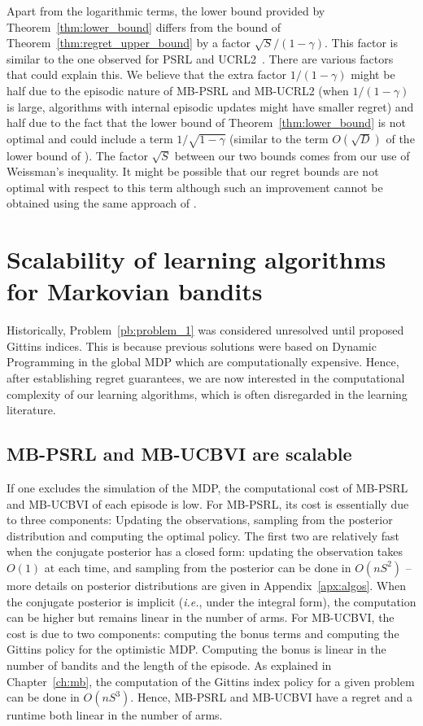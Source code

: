 Apart from the logarithmic terms, the lower bound provided by Theorem~\ref{thm:lower_bound} differs from the bound of Theorem~\ref{thm:regret_upper_bound} by a factor $\sqrt{S}/(1-\gamma)$. This factor is similar to the one observed for PSRL and UCRL2~\cite{osband2013more,jaksch2010near}. There are various factors that could explain this. We believe that the extra factor  $1/(1-\gamma)$ might be half due to the episodic nature of MB-PSRL and MB-UCRL2 (when $1/(1-\gamma)$ is large, algorithms with internal episodic updates might have smaller regret) and half due to the fact that the lower bound of Theorem~\ref{thm:lower_bound} is not optimal and could include a term $1/\sqrt{1-\gamma}$ (similar to the term $O(\sqrt{D})$ of the lower bound of \cite{osband2016lower,jaksch2010near}). The factor $\sqrt{S}$ between our two bounds comes from our use of Weissman's inequality. It might be possible that our regret bounds  are not optimal with respect to this term although such an improvement cannot be obtained using the same approach of \cite{azar2017minimax}.

\section{Scalability of learning algorithms for Markovian bandits}
Historically, Problem~{\ref{pb:problem_1}} was considered unresolved until \cite{gittins1979bandit} proposed Gittins indices. This is because previous solutions were based on Dynamic Programming in the global MDP which are computationally expensive. Hence, after establishing regret guarantees, we are now interested in the computational complexity of our learning algorithms, which is often disregarded in the learning literature.

\subsection{MB-PSRL and MB-UCBVI are scalable}
\label{sec:OFU}

If one excludes the simulation of the MDP, the computational cost of MB-PSRL and MB-UCBVI of each episode is low. For MB-PSRL, its cost is essentially due to three components: Updating the observations, sampling from the posterior distribution and computing the optimal policy. The first two are relatively fast when the conjugate posterior has a closed form: updating the observation takes $O(1)$ at each time, and sampling from the posterior can be done in $O(nS^2)$ -- more details on posterior distributions are given in Appendix~\ref{apx:algos}. When the conjugate posterior is implicit (\emph{i.e.}, under the integral form), the computation can be higher but remains linear in the number of arms. For MB-UCBVI, the cost is due to two components: computing the bonus terms and computing the Gittins policy for the optimistic MDP. Computing the bonus is linear in the number of bandits and the length of the episode. As explained in Chapter~\ref{ch:mb}, the computation of the Gittins index policy for a given problem can be done in $O(nS^3)$. Hence, MB-PSRL and MB-UCBVI have a regret and a runtime both linear in the number of arms.

